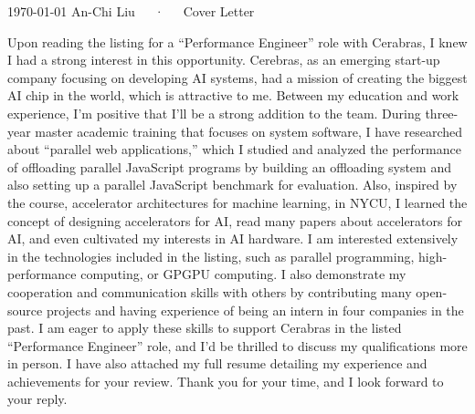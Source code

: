 \documentclass[11pt, a4paper]{awesome-cv}
\begin{document}
\makecvheader[L]

\makecvfooter
  {\today}
  {An-Chi Liu~~~·~~~Cover Letter}
  {}

\makelettertitle

\begin{cvletter}



Upon reading the listing for a ``Performance Engineer'' role with Cerabras,
I knew I had a strong interest in this opportunity.
Cerebras, as an emerging start-up company focusing on developing AI systems,
had a mission of creating the biggest AI chip in the world, which is attractive to me.
Between my education and work experience, I'm positive that I'll be a strong addition to the team.
During three-year master academic training that focuses on system software,
I have researched about ``parallel web applications,''
which I studied and analyzed the performance of offloading parallel JavaScript programs by
building an offloading system and also setting up a parallel JavaScript benchmark for evaluation.
Also, inspired by the course, accelerator architectures for machine learning, in NYCU,
I learned the concept of designing accelerators for AI,
read many papers about accelerators for AI,
and even cultivated my interests in AI hardware.
I am interested extensively in the technologies included in the listing, such as parallel programming, high-performance computing, or GPGPU computing.
I also demonstrate my cooperation and communication skills with others by contributing many open-source projects
and having experience of being an intern in four companies in the past.
I am eager to apply these skills to support Cerabras in the listed ``Performance Engineer'' role,
and I'd be thrilled to discuss my qualifications more in person.
I have also attached my full resume detailing my experience and achievements for your review.
Thank you for your time, and I look forward to your reply.

\end{cvletter}


\makeletterclosing
\end{document}
